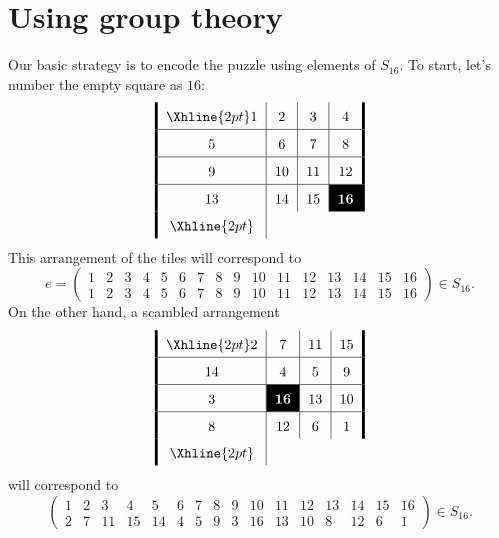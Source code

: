 \documentclass{ximera}
\begin{document}
\section{Using group theory}

Our basic strategy is to encode the puzzle using elements of $S_{16}$.
To start, let's number the empty square as $16$:
\[
\arraycolsep=6pt\def\arraystretch{1.6}
\begin{array}{!{\vline width 2pt}c|c|c|c!{\vline width 2pt}}
    \Xhline{2pt}
    1  & 2  & 3  & 4 \\ \hline
    5  & 6  & 7  & 8 \\ \hline
    9  & 10 & 11 & 12 \\ \hline
    13 & 14 & 15 & \cellcolor{black}\textcolor{white}{\boldsymbol{16}} \\
    \Xhline{2pt}
\end{array}
\]
This arrangement of the tiles will correspond to
\[
e = \left(\begin{smallmatrix}
  1 & 2 & 3 & 4 & 5 & 6 & 7 & 8 & 9 & 10 & 11 & 12 & 13 & 14 & 15 & 16\\
  1 & 2 & 3 & 4 & 5 & 6 & 7 & 8 & 9 & 10 & 11 & 12 & 13 & 14 & 15 & 16
\end{smallmatrix}\right)\in S_{16}.
\]
On the other hand, a scambled arrangement 
\[
\arraycolsep=6pt\def\arraystretch{1.6}
\begin{array}{!{\vline width 2pt}c|c|c|c!{\vline width 2pt}}
    \Xhline{2pt}
    2 & 7  & 11 & 15\\ \hline
    14 & 4  & 5  & 9 \\ \hline
    3  & \cellcolor{black}\textcolor{white}{\boldsymbol{16}}  & 13 & 10  \\ \hline
    8  & 12 & 6 & 1 \\
    \Xhline{2pt}
\end{array}
\]
will correspond to
\[
\left(\begin{smallmatrix}
  1 & 2 & 3 & 4 & 5 & 6 & 7 & 8 & 9 & 10 & 11 & 12 & 13 & 14 & 15 & 16\\
  2 & 7 & 11& 15& 14& 4 & 5 & 9 & 3 & 16  & 13 &  10 &  8 & 12 & 6 & 1
\end{smallmatrix}\right)\in S_{16}.
\]
\end{document}
